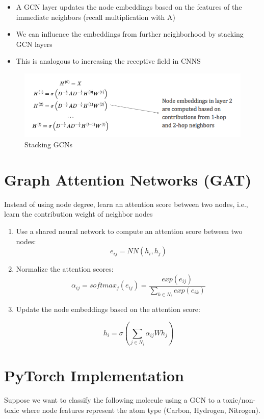 \begin{itemize}
    \item A GCN layer updates the node embeddings based on the features of the immediate
neighbors (recall multiplication with A)
\item We can influence the embeddings from further neighborhood by stacking GCN layers
\item This is analogous to increasing the receptive field in CNNS
\end{itemize}

\begin{figure}[h!t]
    \centering
    \includegraphics[width=0.75\linewidth]{stackingGCN.png}
    \caption{Stacking GCNs}
    \label{fig:enter-label}
\end{figure}

\section{Graph Attention Networks (GAT)}

\begin{idea}
    Instead of using node degree, learn an attention score between two nodes, i.e., learn the contribution weight of neighbor nodes
\end{idea}

\begin{enumerate}
    \item Use a shared neural network to compute an attention score between two nodes:
\[ e_{ij} = NN(h_i, h_j) \]
    \item Normalize the attention scores:
\[ \alpha_{ij} = softmax_j(e_{ij}) = \frac{exp(e_{ij})}{\sum_{k\in N_{i}}exp(e_{ik})} \]
    \item Update the node embeddings based on the attention score:

\[ h_i = \sigma(\sum_{j\in N_i} \alpha_{ij} W h_j) \]
\end{enumerate}

\section{PyTorch Implementation}
\begin{example}
    Suppose we want to classify the following molecule using a GCN to a toxic/non-toxic
where node features represent the atom type (Carbon, Hydrogen, Nitrogen).
\end{example}

